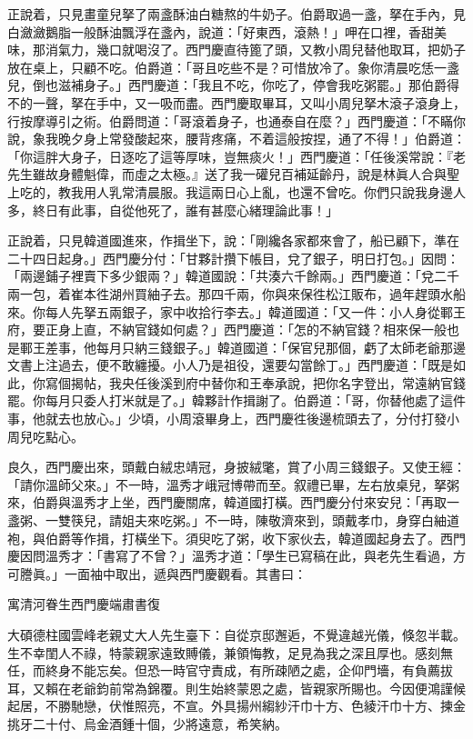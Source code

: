正說着，只見畫童兒拏了兩盞酥油白糖熬的牛奶子。伯爵取過一盞，拏在手內，見白瀲瀲鵝脂一般酥油飄浮在盞內，說道：「好東西，滾熱！」呷在口裡，香甜美味，那消氣力，幾口就喝沒了。西門慶直待篦了頭，又教小周兒替他取耳，把奶子放在桌上，只顧不吃。伯爵道：「哥且吃些不是？可惜放冷了。象你清晨吃恁一盞兒，倒也滋補身子。」西門慶道：「我且不吃，你吃了，停會我吃粥罷。」那伯爵得不的一聲，拏在手中，又一吸而盡。{}西門慶取畢耳，又叫小周兒拏木滾子滾身上，行按摩導引之術。伯爵問道：「哥滾着身子，也通泰自在麼？」西門慶道：「不瞞你說，象我晚夕身上常發酸起來，腰背疼痛，不着這般按捏，通了不得！」伯爵道：「你這胖大身子，日逐吃了這等厚味，豈無痰火！」西門慶道：「任後溪常說：『老先生雖故身體魁偉，而虛之太極。』送了我一礶兒百補延齡丹，說是林眞人合與聖上吃的，教我用人乳常清晨服。我這兩日心上亂，也還不曾吃。你們只說我身邊人多，終日有此事，自從他死了，誰有甚麼心緒理論此事！」{}

正說着，只見韓道國進來，作揖坐下，說：「剛纔各家都來會了，船已顧下，準在二十四日起身。」西門慶分付：「甘夥計攢下帳目，兌了銀子，明日打包。」因問：「兩邊鋪子裡賣下多少銀兩？」韓道國說：「共湊六千餘兩。」西門慶道：「兌二千兩一包，着崔本徃湖州買紬子去。那四千兩，你與來保徃松江販布，過年趕頭水船來。你每人先拏五兩銀子，家中收拾行李去。」韓道國道：「又一件：小人身從鄆王府，要正身上直，不納官錢如何處？」西門慶道：「怎的不納官錢？相來保一般也是鄆王差事，他每月只納三錢銀子。」韓道國道：「保官兒那個，虧了太師老爺那邊文書上注過去，便不敢纏擾。小人乃是祖役，還要勾當餘丁。」西門慶道：「既是如此，你寫個揭帖，我央任後溪到府中替你和王奉承說，把你名字登出，常遠納官錢罷。你每月只委人打米就是了。」韓夥計作揖謝了。伯爵道：「哥，你替他處了這件事，他就去也放心。」少頃，小周滾畢身上，西門慶徃後邊梳頭去了，分付打發小周兒吃點心。

良久，西門慶出來，頭戴白絨忠靖冠，身披絨氅，賞了小周三錢銀子。又使王經：「請你溫師父來。」不一時，溫秀才峨冠博帶而至。叙禮已畢，左右放桌兒，拏粥來，伯爵與溫秀才上坐，西門慶關席，韓道國打橫。西門慶分付來安兒：「再取一盞粥、一雙筷兒，請姐夫來吃粥。」不一時，陳敬濟來到，頭戴孝巾，身穿白紬道袍，與伯爵等作揖，打橫坐下。須臾吃了粥，收下家伙去，韓道國起身去了。西門慶因問溫秀才：「書寫了不曾？」溫秀才道：「學生已寫稿在此，與老先生看過，方可謄眞。」一面袖中取出，遞與西門慶觀看。其書曰：

\begin{myquote}[\markfont]
寓清河眷生西門慶端肅書復

大碩德柱國雲峰老親丈大人先生臺下：自從京邸邂逅，不覺違越光儀，倏忽半載。生不幸閨人不祿，特蒙親家遠致賻儀，兼領悔教，足見為我之深且厚也。感刻無任，而終身不能忘矣。但恐一時官守責成，有所疎陋之處，企仰門墻，有負薦拔耳，又賴在老爺鈞前常為錦覆。則生始終蒙恩之處，皆親家所賜也。今因便鴻謹候起居，不勝馳戀，伏惟照亮，不宣。外具揚州縐紗汗巾十方、色綾汗巾十方、揀金挑牙二十付、烏金酒鍾十個，少將遠意，希笑納。
\end{myquote}

